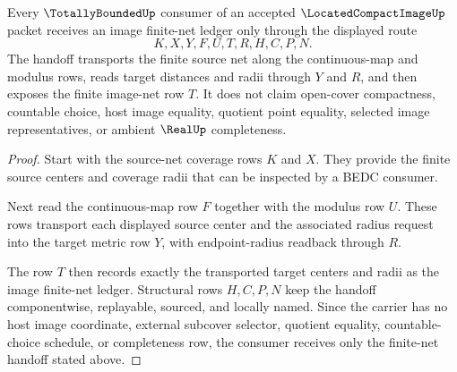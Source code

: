 \begin{theorem}
\label{thm:located-compact-image-finite-net-handoff}
Every $\TotallyBoundedUp$ consumer of an accepted $\LocatedCompactImageUp$ packet receives an image finite-net ledger only through the displayed route
$$
K,X,Y,F,U,T,R,H,C,P,N .
$$
The handoff transports the finite source net along the continuous-map and modulus rows, reads target distances and radii through $Y$ and $R$, and then exposes the finite image-net row $T$. It does not claim open-cover compactness, countable choice, host image equality, quotient point equality, selected image representatives, or ambient $\RealUp$ completeness.
\end{theorem}
\begin{proof}
Start with the source-net coverage rows $K$ and $X$. They provide the finite source centers and coverage radii that can be inspected by a BEDC consumer.

Next read the continuous-map row $F$ together with the modulus row $U$. These rows transport each displayed source center and the associated radius request into the target metric row $Y$, with endpoint-radius readback through $R$.

The row $T$ then records exactly the transported target centers and radii as the image finite-net ledger. Structural rows $H,C,P,N$ keep the handoff componentwise, replayable, sourced, and locally named. Since the carrier has no host image coordinate, external subcover selector, quotient equality, countable-choice schedule, or completeness row, the consumer receives only the finite-net handoff stated above.
\end{proof}


\begin{closurestatus}{\LocatedCompactImageUp}
  \theoryclosure{\seedClosure}
  \formalstatus{\unformalizedV}
\end{closurestatus}
